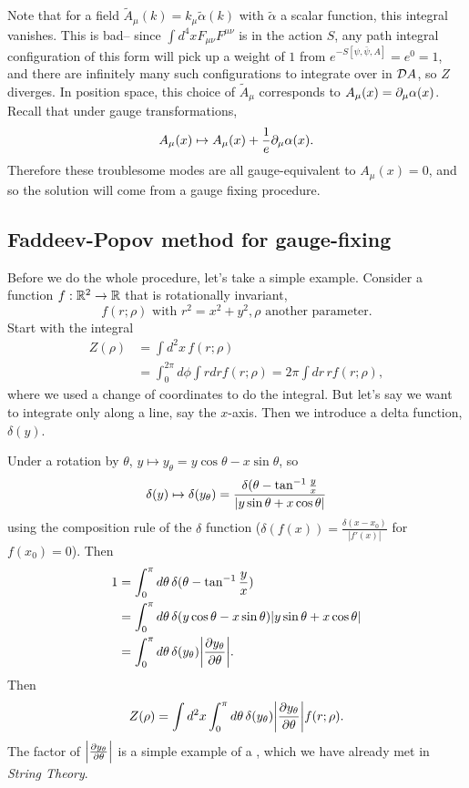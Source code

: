 Note that for a field $\tilde A_\mu(k)=k_\mu \tilde \alpha(k)$ with $\tilde \alpha$ a scalar function, this integral vanishes. This is bad-- since $\int d^4x F_{\mu\nu} F^{\mu\nu}$ is in the action $S$, any path integral configuration of this form will pick up a weight of $1$ from $e^{-S[\psi,\bar\psi,A]}=e^0=1$, and there are infinitely many such configurations to integrate over in $\cD A$, so $Z$ diverges. In position space, this choice of $\tilde A_\mu$ corresponds to $A_\mu(x)=\p_\mu\alpha(x)$.
Recall that under gauge transformations,
\begin{equation}
    A_\mu(x)\mapsto A_\mu(x) +\frac{1}{e} \p_\mu \alpha(x).
\end{equation}
Therefore these troublesome modes are all gauge-equivalent to $A_\mu(x)=0$, and so the solution will come from a gauge fixing procedure.

\subsection*{Faddeev-Popov method for gauge-fixing} Before we do the whole procedure, let's take a simple example. Consider a function $f:\RR^2\to \RR$ that is rotationally invariant,
\begin{equation}
    f(r;\rho)\text{ with }r^2=x^2+y^2,\rho\text{ another parameter}.
\end{equation}
Start with the integral
\begin{align*}
    Z(\rho)&=\int d^2x\, f(r;\rho)\\
        &= \int_0^{2\pi} d\phi \int rdr f(r;\rho) =2\pi \int dr\, r f(r;\rho),
\end{align*}
where we used a change of coordinates to do the integral. But let's say we want to integrate only along a line, say the $x$-axis. Then we introduce a delta function, $\delta(y)$.

Under a rotation by $\theta$, $y\mapsto y_\theta = y\cos\theta -x\sin\theta$, so
\begin{equation}
    \delta(y) \mapsto \delta(y_\theta) = \frac{\delta(\theta-\tan^{-1}\frac{y}{x}}{\abs{y\sin\theta +x\cos\theta}}
\end{equation}
using the composition rule of the $\delta$ function ($\delta(f(x))=\frac{\delta(x-x_0)}{|f'(x)|}$ for $f(x_0)=0$).
Then
\begin{align*}
    1 &= \int_0^\pi d\theta\, \delta(\theta-\tan^{-1}\frac{y}{x})\\
        &= \int_0^\pi d\theta \, \delta(y\cos\theta-x\sin\theta)\abs{y\sin\theta +x\cos\theta}\\
        &= \int_0^\pi d\theta\, \delta(y_\theta) \abs*{\P{y_\theta}{\theta}}.
\end{align*}
Then
\begin{equation}
    Z(\rho)=\int d^2x \int_0^\pi d\theta\, \delta(y_\theta) \abs*{\P{y_\theta}{\theta}} f(r;\rho).
\end{equation}
The factor of $\abs*{\P{y_\theta}{\theta}}$ is a simple example of a , which we have already met in \emph{String Theory}.

